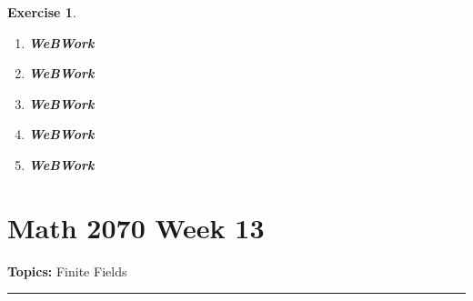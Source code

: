 \documentclass[a4paper,12pt]{report}
\newcounter{statement}
\numberwithin{statement}{chapter}
\newtheorem{ex}[statement]{\bf Exercise}
\numberwithin{equation}{chapter}
\numberwithin{section}{chapter}
\numberwithin{subsection}{section}
\begin{document}
\begin{ex}
\begin{enumerate}
\item  
{\bf WeBWork}

\item  
{\bf WeBWork}

\item  
{\bf WeBWork}

\item  
{\bf WeBWork}

\item  
{\bf WeBWork}
\end{enumerate}
\end{ex}
\setcounter{chapter}{13}\setcounter{section}{0}
\setcounter{subsection}{0}
\setcounter{statement}{0}

\chapter*{Math 2070 Week 13}
{\bf Topics: }Finite Fields
\hrule
\end{document}
